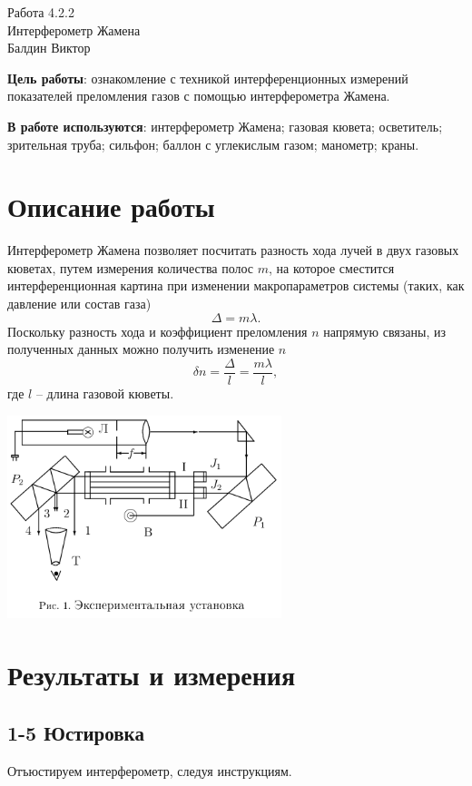 \documentclass[a4paper,12pt]{article}
\begin{document}
\begin{center}
  \LARGE{Работа 4.2.2}\\[0.2cm]
  \LARGE{Интерферометр Жамена}\\[0.2cm]
  \large{Балдин Виктор}\\[0.2cm]
\end{center}

\textbf{Цель работы}: ознакомление с техникой интерференционных измерений показателей преломления газов с помощью интерферометра Жамена.

\textbf{В работе используются}: интерферометр Жамена; газовая кювета; осветитель; зрительная труба; сильфон; баллон с углекислым газом; манометр; краны.

\section*{Описание работы}
Интерферометр Жамена позволяет посчитать разность хода лучей в двух газовых кюветах, путем измерения количества полос $m$, на которое сместится интерференционная картина при изменении макропараметров системы (таких, как давление или состав газа)
\[\Delta = m \lambda.\]
Поскольку разность хода и коэффициент преломления $n$ напрямую связаны, из полученных данных можно получить изменение $n$
\[\delta n = \frac{\Delta}{l} = \frac{m \lambda}{l},\]
где $l$ -- длина газовой кюветы.

\begin{center}
\includegraphics[width=0.60\textwidth]{0.png}
\end{center}

\section*{Результаты и измерения}
\subsection*{1-5 Юстировка}
Отъюстируем интерферометр, следуя инструкциям.
\end{document}
